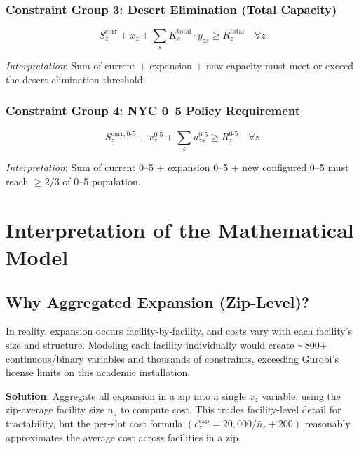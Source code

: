 \documentclass[12pt]{article}
\begin{document}
\subsubsection{Constraint Group 3: Desert Elimination (Total Capacity)}

\begin{equation}
S_z^{\text{curr}} + x_z + \sum_{s} K_s^{\text{total}} \cdot y_{zs} \geq R_z^{\text{total}} \quad \forall z \label{eq:c3_desert}
\end{equation}

\textit{Interpretation}: Sum of current + expansion + new capacity must meet or exceed the desert elimination threshold.

\subsubsection{Constraint Group 4: NYC 0--5 Policy Requirement}

\begin{equation}
S_z^{\text{curr}, 0\text{-}5} + x_z^{0\text{-}5} + \sum_{s} u_{zs}^{0\text{-}5} \geq R_z^{0\text{-}5} \quad \forall z \label{eq:c4_policy}
\end{equation}

\textit{Interpretation}: Sum of current 0--5 + expansion 0--5 + new configured 0--5 must reach $\geq 2/3$ of 0--5 population.

\section{Interpretation of the Mathematical Model}

\subsection{Why Aggregated Expansion (Zip-Level)?}

In reality, expansion occurs facility-by-facility, and costs vary with each facility's size and structure. 
Modeling each facility individually would create $\sim$800+ continuous/binary variables and thousands of constraints, 
exceeding Gurobi's license limits on this academic installation.

\textbf{Solution}: Aggregate all expansion in a zip into a single $x_z$ variable, using the zip-average facility size 
$\bar{n}_z$ to compute cost. This trades facility-level detail for tractability, but the per-slot cost formula 
$(c_z^{\text{exp}} = 20{,}000 / \bar{n}_z + 200)$ reasonably approximates the average cost across facilities in a zip.
\end{document}
